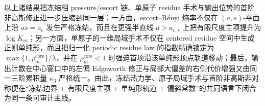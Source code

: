 \noindent
以上诸结果把冻结相 pressure/escort 链、单原子 residue 手术与输出位势的首阶非高斯修正进一步压缩到同一层：一方面，escort--Rényi 熵率不仅在 \((a,s)\)-平面上沿 \(as=a_{\mathrm c}\) 发生严格冻结，而且在更强半直线 \(a>a_{\mathrm c,s}\) 上把有限尺度主项提升为 \(\log K_m\)；另一方面，单原子的一维局域手术不仅在 centered residue 空间中生成正则单纯形，而且把归一化 periodic residue law 的指数精确锁定为 \(\max\{1,\rho_m^{\mathrm{core}}\}/\lambda\)，并在 \(\rho_m^{\mathrm{core}}<1\) 时强迫首项沿该单纯形顶点轨道移动；最后，输出计数在中心窗口中的左偏 Edgeworth 修正与局部大偏差的右侧代价增强又由同一三阶累积量 \(\kappa_3\) 严格统一。由此，冻结热力学、原子局域手术与首阶非高斯非对称便在“冻结边界 + 有限尺度主项 + 单纯形轨道 + 偏斜常数”的共同语言下闭合为同一条可审计主线。

\endinput
